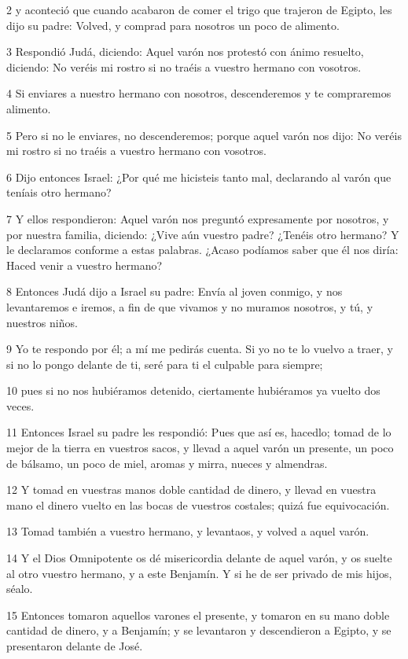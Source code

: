 2 y aconteció que cuando acabaron de comer el trigo que trajeron de Egipto, les dijo su padre: Volved, y comprad para nosotros un poco de alimento.

3 Respondió Judá, diciendo: Aquel varón nos protestó con ánimo resuelto, diciendo: No veréis mi rostro si no traéis a vuestro hermano con vosotros.

4 Si enviares a nuestro hermano con nosotros, descenderemos y te compraremos alimento.

5 Pero si no le enviares, no descenderemos; porque aquel varón nos dijo: No veréis mi rostro si no traéis a vuestro hermano con vosotros.

6 Dijo entonces Israel: ¿Por qué me hicisteis tanto mal, declarando al varón que teníais otro hermano?

7 Y ellos respondieron: Aquel varón nos preguntó expresamente por nosotros, y por nuestra familia, diciendo: ¿Vive aún vuestro padre? ¿Tenéis otro hermano? Y le declaramos conforme a estas palabras. ¿Acaso podíamos saber que él nos diría: Haced venir a vuestro hermano?

8 Entonces Judá dijo a Israel su padre: Envía al joven conmigo, y nos levantaremos e iremos, a fin de que vivamos y no muramos nosotros, y tú, y nuestros niños.

9 Yo te respondo por él; a mí me pedirás cuenta. Si yo no te lo vuelvo a traer, y si no lo pongo delante de ti, seré para ti el culpable para siempre;

10 pues si no nos hubiéramos detenido, ciertamente hubiéramos ya vuelto dos veces.

11 Entonces Israel su padre les respondió: Pues que así es, hacedlo; tomad de lo mejor de la tierra en vuestros sacos, y llevad a aquel varón un presente, un poco de bálsamo, un poco de miel, aromas y mirra, nueces y almendras.

12 Y tomad en vuestras manos doble cantidad de dinero, y llevad en vuestra mano el dinero vuelto en las bocas de vuestros costales; quizá fue equivocación.

13 Tomad también a vuestro hermano, y levantaos, y volved a aquel varón.

14 Y el Dios Omnipotente os dé misericordia delante de aquel varón, y os suelte al otro vuestro hermano, y a este Benjamín. Y si he de ser privado de mis hijos, séalo.

15 Entonces tomaron aquellos varones el presente, y tomaron en su mano doble cantidad de dinero, y a Benjamín; y se levantaron y descendieron a Egipto, y se presentaron delante de José.

